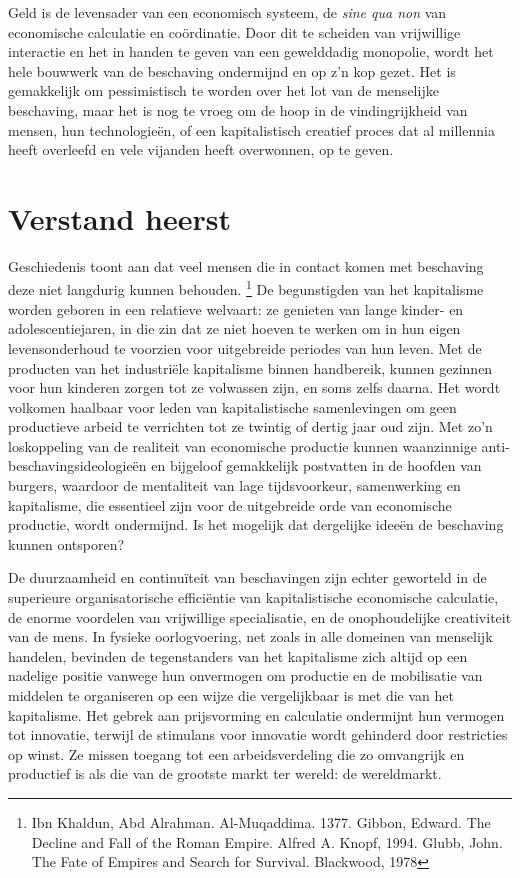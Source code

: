 \documentclass[
  a5paper,
  smalldemyvopaper,11pt,twoside,onecolumn,openright,extrafontsizes,
hidelinks]{memoir}
\begin{document}
Geld is de levensader van een economisch systeem, de \emph{sine qua non}
van economische calculatie en coördinatie. Door dit te scheiden van
vrijwillige interactie en het in handen te geven van een gewelddadig
monopolie, wordt het hele bouwwerk van de beschaving ondermijnd en op
z'n kop gezet. Het is gemakkelijk om pessimistisch te worden over het
lot van de menselijke beschaving, maar het is nog te vroeg om de hoop in
de vindingrijkheid van mensen, hun technologieën, of een kapitalistisch
creatief proces dat al millennia heeft overleefd en vele vijanden heeft
overwonnen, op te geven.

\section{Verstand heerst}\label{verstand-heerst}

Geschiedenis toont aan dat veel mensen die in contact komen met
beschaving deze niet langdurig kunnen behouden. \footnote{Ibn Khaldun,
  Abd Alrahman. Al-Muqaddima. 1377. Gibbon, Edward. The Decline and Fall
  of the Roman Empire. Alfred A. Knopf, 1994. Glubb, John. The Fate of
  Empires and Search for Survival. Blackwood, 1978} De begunstigden van
het kapitalisme worden geboren in een relatieve welvaart: ze genieten
van lange kinder- en adolescentiejaren, in die zin dat ze niet hoeven te
werken om in hun eigen levensonderhoud te voorzien voor uitgebreide
periodes van hun leven. Met de producten van het industriële kapitalisme
binnen handbereik, kunnen gezinnen voor hun kinderen zorgen tot ze
volwassen zijn, en soms zelfs daarna. Het wordt volkomen haalbaar voor
leden van kapitalistische samenlevingen om geen productieve arbeid te
verrichten tot ze twintig of dertig jaar oud zijn. Met zo'n loskoppeling
van de realiteit van economische productie kunnen waanzinnige
anti-beschavingsideologieën en bijgeloof gemakkelijk postvatten in de
hoofden van burgers, waardoor de mentaliteit van lage tijdsvoorkeur,
samenwerking en kapitalisme, die essentieel zijn voor de uitgebreide
orde van economische productie, wordt ondermijnd. Is het mogelijk dat
dergelijke ideeën de beschaving kunnen ontsporen?

De duurzaamheid en continuïteit van beschavingen zijn echter geworteld
in de superieure organisatorische efficiëntie van kapitalistische
economische calculatie, de enorme voordelen van vrijwillige
specialisatie, en de onophoudelijke creativiteit van de mens. In fysieke
oorlogvoering, net zoals in alle domeinen van menselijk handelen,
bevinden de tegenstanders van het kapitalisme zich altijd op een
nadelige positie vanwege hun onvermogen om productie en de mobilisatie
van middelen te organiseren op een wijze die vergelijkbaar is met die
van het kapitalisme. Het gebrek aan prijsvorming en calculatie
ondermijnt hun vermogen tot innovatie, terwijl de stimulans voor
innovatie wordt gehinderd door restricties op winst. Ze missen toegang
tot een arbeidsverdeling die zo omvangrijk en productief is als die van
de grootste markt ter wereld: de wereldmarkt.
\end{document}

